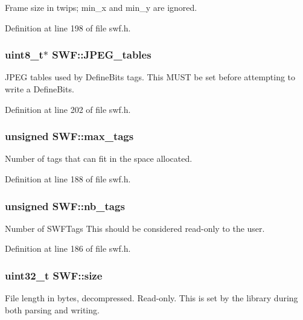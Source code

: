 Frame size in twips; min\-\_\-x and min\-\_\-y are ignored. 



Definition at line 198 of file swf.\-h.

\hypertarget{struct_s_w_f_ae63eda75022e0100a17e78b200d607a4}{
\subsubsection[{J\-P\-E\-G\-\_\-tables}]{\setlength{\rightskip}{0pt plus 5cm}uint8\-\_\-t$\ast$ S\-W\-F\-::\-J\-P\-E\-G\-\_\-tables\hspace{0.3cm}{\ttfamily [protected]}}}\label{struct_s_w_f_ae63eda75022e0100a17e78b200d607a4}
J\-P\-E\-G tables used by Define\-Bits tags. This M\-U\-S\-T be set before attempting to write a Define\-Bits. 

Definition at line 202 of file swf.\-h.

\hypertarget{struct_s_w_f_a341ef0cf50f79cad21ae0db9fe483dc1}{
\subsubsection[{max\-\_\-tags}]{\setlength{\rightskip}{0pt plus 5cm}unsigned S\-W\-F\-::max\-\_\-tags\hspace{0.3cm}{\ttfamily [protected]}}}\label{struct_s_w_f_a341ef0cf50f79cad21ae0db9fe483dc1}


Number of tags that can fit in the space allocated. 



Definition at line 188 of file swf.\-h.

\hypertarget{struct_s_w_f_ae9a2ba32a4a650ec76d45cc5211f77b0}{
\subsubsection[{nb\-\_\-tags}]{\setlength{\rightskip}{0pt plus 5cm}unsigned S\-W\-F\-::nb\-\_\-tags}}\label{struct_s_w_f_ae9a2ba32a4a650ec76d45cc5211f77b0}
Number of S\-W\-F\-Tags This should be considered read-\/only to the user. 

Definition at line 186 of file swf.\-h.

\hypertarget{struct_s_w_f_a5e4ec5c09472acb241a3122606d833b2}{
\subsubsection[{size}]{\setlength{\rightskip}{0pt plus 5cm}uint32\-\_\-t S\-W\-F\-::size}}\label{struct_s_w_f_a5e4ec5c09472acb241a3122606d833b2}
File length in bytes, decompressed. Read-\/only. This is set by the library during both parsing and writing. 

